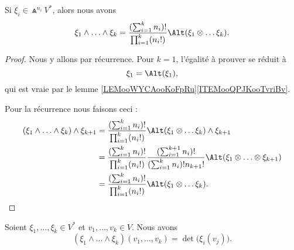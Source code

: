 \begin{lemma}		\label{LEMooZJJLooFGuguy}
	Si \( \xi_i\in \Wedge^{n_i}V^*\), alors nous avons
	\begin{equation}
		\xi_1\wedge\ldots \wedge \xi_k=\frac{ (\sum_{i=1}^kn_i)! }{ \prod_{i=1}^k(n_i!) }\Alt(\xi_1\otimes \ldots \xi_k).
	\end{equation}
\end{lemma}

\begin{proof}
	Nous y allons par récurrence. Pour \( k=1\), l'égalité à prouver se réduit à
	\begin{equation}
		\xi_1=\Alt(\xi_1),
	\end{equation}
	qui est vraie par le lemme \ref{LEMooWYCAooKoFpRu}\ref{ITEMooQPJKooTvriBv}.

	Pour la récurrence nous faisons ceci :
	\begin{subequations}
		\begin{align}
			(\xi_1\wedge\ldots \wedge \xi_k)\wedge \xi_{k+1} & =\frac{ (\sum_{i=1}^kn_i)! }{ \prod_{i=1}^k(n_i!) }\Alt(\xi_1\otimes \ldots \xi_k)\wedge \xi_{k+1}                                                        \\
			                                                 & =\frac{ (\sum_{i=1}^kn_i)! }{ \prod_{i=1}^k(n_i!) }\frac{ (\sum_{i=1}^{k+1}n_i)! }{ (\sum_{i=1}^kn_i)!n_{k+1}! }\Alt(\xi_1\otimes\ldots\otimes \xi_{k+1}) \\
			                                                 & =\frac{ (\sum_{i=1}^kn_i)! }{ \prod_{i=1}^k(n_i!) }\Alt(\xi_1\otimes \ldots \xi_k).
		\end{align}
	\end{subequations}
\end{proof}

\begin{proposition}		\label{PROPooRRSZooJXOApq}
	Soient \( \xi_1,\ldots,\xi_k\in V^*\) et \( v_1,\ldots,v_k\in V\). Nous avons
	\begin{equation}
		(\xi_1\wedge\ldots\wedge \xi_k)(v_1,\ldots,v_k)=\det\big( \xi_i(v_j) \big).
	\end{equation}
\end{proposition}

